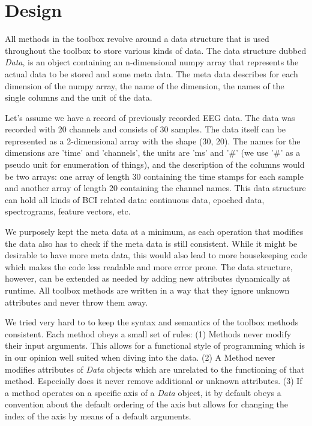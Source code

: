 \documentclass[letterpaper,compsoc,twoside]{IEEEtran}
\providecommand*{\DUroletitlereference}[1]{\textsl{#1}}
\begin{document}
\section{Design\label{design}}


All methods in the toolbox revolve around a data structure that is used
throughout the toolbox to store various kinds of data. The data structure dubbed
\DUroletitlereference{Data}, is an object containing an n-dimensional numpy array that represents the
actual data to be stored and some meta data. The meta data describes for each
dimension of the numpy array, the name of the dimension, the names of the single
columns and the unit of the data.

Let's assume we have a record of previously recorded EEG data. The data was
recorded with 20 channels and consists of 30 samples. The data itself can be
represented as a 2-dimensional array with the shape (30, 20). The names for the
dimensions are 'time' and 'channels', the units are 'ms' and '\#' (we use '\#' as
a pseudo unit for enumeration of things), and the description of the columns
would be two arrays: one array of length 30 containing the time stamps for each
sample and another array of length 20 containing the channel names. This data
structure can hold all kinds of BCI related data: continuous data, epoched data,
spectrograms, feature vectors, etc.

We purposely kept the meta data at a minimum, as each operation that modifies
the data also has to check if the meta data is still consistent. While it might
be desirable to have more meta data, this would also lead to more housekeeping
code which makes the code less readable and more error prone. The data
structure, however, can be extended as needed by adding new attributes
dynamically at runtime. All toolbox methods are written in a way that they
ignore unknown attributes and never throw them away.

We tried very hard to to keep the syntax and semantics of the toolbox methods
consistent. Each method obeys a small set of rules: (1) Methods never modify
their input arguments. This allows for a functional style of programming which
is in our opinion well suited when diving into the data. (2) A Method never
modifies attributes of \DUroletitlereference{Data} objects which are unrelated to the functioning of
that method. Especially does it never remove additional or unknown attributes.
(3) If a method operates on a specific axis of a \DUroletitlereference{Data} object, it by default
obeys a convention about the default ordering of the axis but allows for
changing the index of the axis by means of a default arguments.
\end{document}
